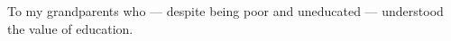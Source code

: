 \vspace*{7cm}
\begin{center}
To my grandparents who --- despite being poor and uneducated --- understood the value of education.
\end{center}
